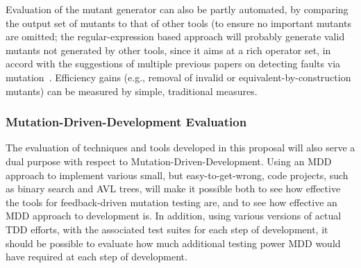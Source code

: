 Evaluation of the mutant generator can also be partly automated, by
comparing the output set of mutants to that of other tools (to ensure
no important mutants are omitted; the regular-expression based
approach will probably generate valid mutants not generated by other
tools, since it aims at a rich operator set, in accord with the
suggestions of multiple previous papers on detecting faults via
mutation~\cite{just2014mutants,gopinath2017mutation}.  Efficiency
gains (e.g., removal of invalid or equivalent-by-construction mutants) can
be measured by simple, traditional measures.

\subsubsection{Mutation-Driven-Development Evaluation}
\label{sec:mevalplan}

The evaluation of techniques and tools developed in this proposal will
also serve a dual purpose with respect to
Mutation-Driven-Development.  Using an MDD approach to implement
various small, but easy-to-get-wrong, code projects, such as binary
search and AVL trees, will make it possible both to see how effective
the tools for feedback-driven mutation testing are, and to see how effective an MDD approach to development is.  In
addition, using various versions of actual TDD efforts, with the
associated test suites for each step of development, it should be
possible to evaluate how much additional testing power MDD would have
required at each step of development.